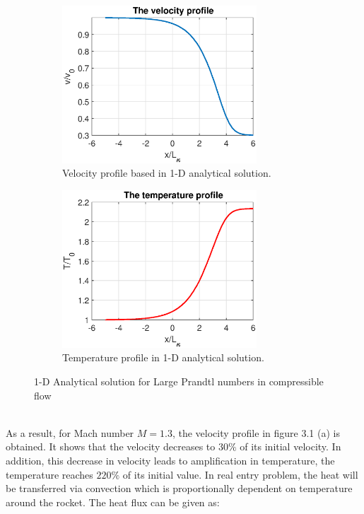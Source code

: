 \documentclass[12pt]{report}
\begin{document}
\begin{figure}[h!]
\centering
\begin{subfigure}[b]{0.5\textwidth}
        \centering
\label{fig:1DVel}
 \includegraphics[width=0.8\textwidth]{1DVel.eps}
 \caption{Velocity  profile based in 1-D analytical solution.}
    \end{subfigure}%
    \begin{subfigure}[b]{0.5\textwidth}
        \centering
        \label{fig:1DTemp}
        \includegraphics[width=0.8\textwidth]{1DTemp.eps}
        \caption{Temperature  profile in 1-D analytical solution.}
    \end{subfigure}
\caption{1-D Analytical solution for Large Prandtl numbers in compressible flow \cite{Johnson}}
\end{figure}
\\
As a result, for Mach number $M=1.3$, the velocity profile in figure 3.1 (a) is obtained. It shows that the velocity decreases to $30\%$ of its initial velocity. In addition, this decrease in velocity leads to amplification in temperature, the temperature reaches $220\%$ of its initial value. In real entry problem, the heat will be transferred via convection which is proportionally dependent on temperature around the rocket. The heat flux can be given as:
\end{document}
